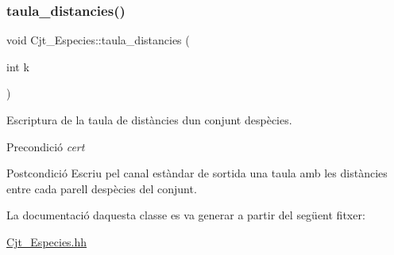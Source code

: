 \subsubsection{\texorpdfstring{taula\+\_\+distancies()}{taula\_distancies()}}
{\footnotesize\ttfamily void Cjt\+\_\+\+Especies\+::taula\+\_\+distancies (\begin{DoxyParamCaption}\item[{int}]{k }\end{DoxyParamCaption})}



Escriptura de la taula de distàncies d\textquotesingle{}un conjunt d\textquotesingle{}espècies. 

\begin{DoxyPrecond}{Precondició}
{\itshape cert} 
\end{DoxyPrecond}
\begin{DoxyPostcond}{Postcondició}
Escriu pel canal estàndar de sortida una taula amb les distàncies entre cada parell d\textquotesingle{}espècies del conjunt. 
\end{DoxyPostcond}


La documentació d\textquotesingle{}aquesta classe es va generar a partir del següent fitxer\+:\begin{DoxyCompactItemize}
\item 
\hyperlink{_cjt___especies_8hh}{Cjt\+\_\+\+Especies.\+hh}\end{DoxyCompactItemize}
